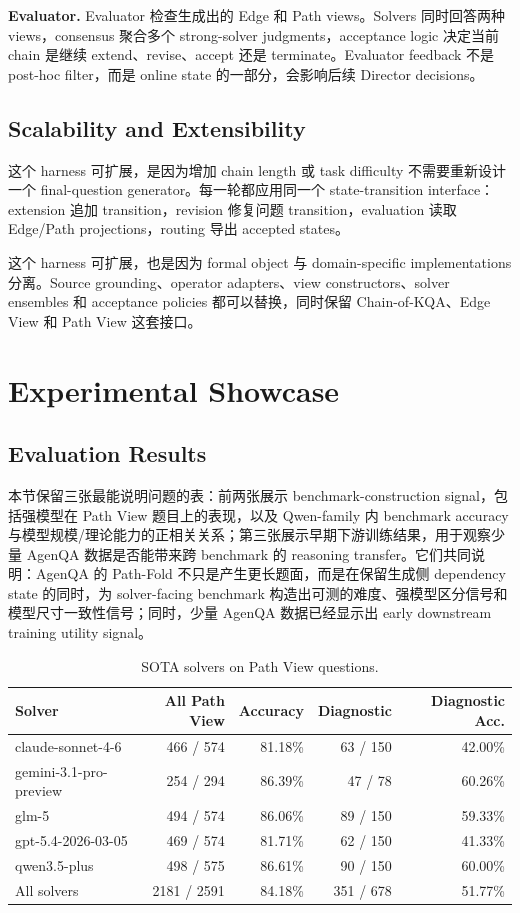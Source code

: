 \documentclass[11pt]{ctexart}
\newcommand{\tightparagraph}[1]{\vspace{0.4em}\noindent\textbf{#1}}
\begin{document}
\tightparagraph{Evaluator.} Evaluator 检查生成出的 Edge 和 Path views。Solvers 同时回答两种 views，consensus 聚合多个 strong-solver judgments，acceptance logic 决定当前 chain 是继续 extend、revise、accept 还是 terminate。Evaluator feedback 不是 post-hoc filter，而是 online state 的一部分，会影响后续 Director decisions。

\subsection{Scalability and Extensibility}

这个 harness 可扩展，是因为增加 chain length 或 task difficulty 不需要重新设计一个 final-question generator。每一轮都应用同一个 state-transition interface：extension 追加 transition，revision 修复问题 transition，evaluation 读取 Edge/Path projections，routing 导出 accepted states。

这个 harness 可扩展，也是因为 formal object 与 domain-specific implementations 分离。Source grounding、operator adapters、view constructors、solver ensembles 和 acceptance policies 都可以替换，同时保留 Chain-of-KQA、Edge View 和 Path View 这套接口。

\section{Experimental Showcase}

\subsection{Evaluation Results}

本节保留三张最能说明问题的表：前两张展示 benchmark-construction signal，包括强模型在 Path View 题目上的表现，以及 Qwen-family 内 benchmark accuracy 与模型规模/理论能力的正相关关系；第三张展示早期下游训练结果，用于观察少量 AgenQA 数据是否能带来跨 benchmark 的 reasoning transfer。它们共同说明：AgenQA 的 Path-Fold 不只是产生更长题面，而是在保留生成侧 dependency state 的同时，为 solver-facing benchmark 构造出可测的难度、强模型区分信号和模型尺寸一致性信号；同时，少量 AgenQA 数据已经显示出 early downstream training utility signal。

\begin{table}[H]
\centering
\small
\caption{SOTA solvers on Path View questions.}
\label{tab:sota}
\begin{tabular}{lrrrr}
\toprule
Solver & All Path View & Accuracy & Diagnostic & Diagnostic Acc. \\
\midrule
claude-sonnet-4-6 & 466 / 574 & 81.18\% & 63 / 150 & 42.00\% \\
gemini-3.1-pro-preview & 254 / 294 & 86.39\% & 47 / 78 & 60.26\% \\
glm-5 & 494 / 574 & 86.06\% & 89 / 150 & 59.33\% \\
gpt-5.4-2026-03-05 & 469 / 574 & 81.71\% & 62 / 150 & 41.33\% \\
qwen3.5-plus & 498 / 575 & 86.61\% & 90 / 150 & 60.00\% \\
\midrule
All solvers & 2181 / 2591 & 84.18\% & 351 / 678 & 51.77\% \\
\bottomrule
\end{tabular}
\end{table}
\end{document}
